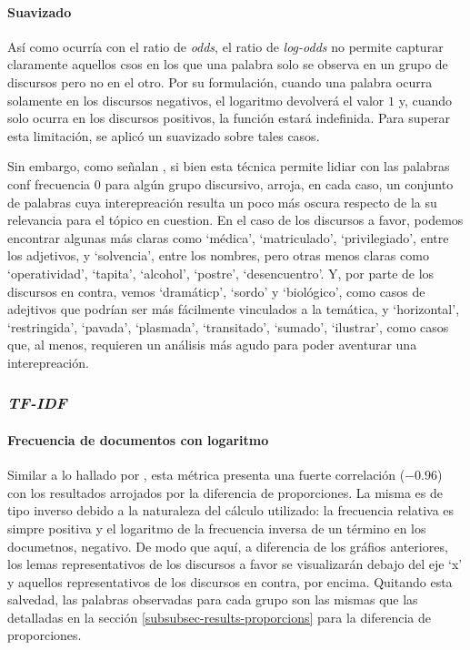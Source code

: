 \paragraph{Suavizado}
Así como ocurría con el ratio de \textit{odds}, el ratio de \textit{log-odds} no
permite capturar claramente aquellos csos en los que una palabra solo se observa en
un grupo de discursos pero no en el otro. Por su formulación, cuando una palabra
ocurra solamente en los discursos negativos, el logaritmo devolverá el valor $1$ y,
cuando solo ocurra en los discursos positivos, la función estará indefinida. Para
superar esta limitación, se aplicó un suavizado sobre tales casos.
\par
Sin embargo, como señalan \cite{monroe2008fightin}, si bien esta técnica permite
lidiar con las palabras conf frecuencia $0$ para algún grupo discursivo, arroja,
en cada caso, un conjunto de palabras cuya interepreación resulta un poco más
oscura respecto de la su relevancia para el tópico en cuestion. En el caso
de los discursos a favor, podemos encontrar algunas más claras como `médica',
`matriculado', `privilegiado', entre los adjetivos, y `solvencia', entre los nombres,
pero otras menos claras como `operatividad', `tapita', `alcohol', `postre',
`desencuentro'. Y, por parte de los discursos en contra, vemos `dramáticp', `sordo' y
`biológico', como casos de adejtivos que podrían ser más fácilmente vinculados a la
temática, y `horizontal', `restringida', `pavada', `plasmada', `transitado', `sumado',
`ilustrar', como casos que, al menos, requieren un análisis más agudo para poder
aventurar una interepreación.

\subsubsection{\textit{TF-IDF}}

\paragraph{Frecuencia de documentos con logaritmo}
Similar a lo hallado por \cite{monroe2008fightin}, esta métrica presenta una
fuerte correlación ($-0.96$) con los resultados arrojados por la diferencia
de proporciones. La misma es de tipo inverso debido a la naturaleza del cálculo
utilizado: la frecuencia relativa es simpre positiva y el logaritmo de la
frecuencia inversa de un término en los documetnos, negativo. De modo que aquí,
a diferencia de los gráfios anteriores, los lemas representativos de los discursos
a favor se visualizarán debajo del eje `x' y aquellos representativos de los
discursos en contra, por encima. Quitando esta salvedad, las palabras observadas
para cada grupo son las mismas que las detalladas en la sección
\ref{subsubsec-results-proporcions} para la diferencia de proporciones.


